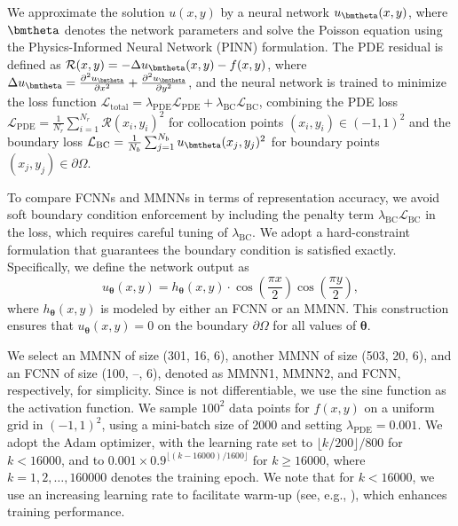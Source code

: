 \documentclass[review,hidelinks,onefignum,onetabnum]{siamart250211}
\begin{document}
 We approximate the solution \( u(x, y) \) by a neural network \( u_\bmtheta(x, y) \), where \( \bmtheta \) denotes the network parameters and solve the Poisson equation using the Physics-Informed Neural Network (PINN) \cite{RAISSI2019686} formulation.
The PDE residual is defined as \(\mathcal{R}(x, y) = -\Delta u_\bmtheta(x, y) - f(x, y)\), where \(\Delta u_\bmtheta = \frac{\partial^2 u_\bmtheta}{\partial x^2} + \frac{\partial^2 u_\bmtheta}{\partial y^2}\), and the neural network is trained to minimize the loss function \(\mathcal{L}_{\text{total}} = \lambda_{\text{PDE}}\mathcal{L}_{\text{PDE}} + \lambda_{\text{BC}}\mathcal{L}_{\text{BC}}\), combining the PDE loss \(\mathcal{L}_{\text{PDE}} = \frac{1}{N_r} \sum_{i=1}^{N_r} \mathcal{R}(x_i, y_i)^2\) for collocation points \((x_i, y_i) \in (-1,1)^2\) and the boundary loss \(\mathcal{L}_{\text{BC}} = \frac{1}{N_b} \sum_{j=1}^{N_b} u_\bmtheta(x_j, y_j)^2\) for boundary points \((x_j, y_j) \in \partial \Omega\).


To compare FCNNs and MMNNs in terms of representation accuracy, we avoid soft boundary condition enforcement by including the penalty term \(\lambda_{\text{BC}}\mathcal{L}_{\text{BC}}\) in the loss, which requires careful tuning of \(\lambda_{\text{BC}}\). 
We adopt a hard-constraint formulation that guarantees the boundary condition is satisfied exactly. Specifically, we define the network output as
\[
u_{\bm{\theta}}(x, y) = h_{\bm{\theta}}(x, y) \cdot \cos\left(\frac{\pi x}{2}\right)\cos\left(\frac{\pi y}{2}\right),
\]
where \( h_{\bm{\theta}}(x, y) \) is modeled by either an FCNN or an MMNN. This construction ensures that \( u_{\bm{\theta}}(x, y) = 0 \) on the boundary \( \partial \Omega \) for all values of \( \bm{\theta} \).


We select an MMNN of size (301, 16, 6), another MMNN of size (503, 20, 6), and an FCNN of size (100, --, 6), denoted as MMNN1, MMNN2, and FCNN, respectively, for simplicity. 
Since \ReLU{} is not differentiable, we use the sine function as the activation function.
We sample \(100^2\) data points for \(f(x,y)\) on a uniform grid in \((-1,1)^2\), using a mini-batch size of 2000 and setting \(\lambda_{\text{PDE}} = 0.001\). 
We adopt the Adam optimizer, with the learning rate set to 
\(\lfloor k/200 \rfloor / 800\) for \(k < 16000\), and to 
\(0.001 \times 0.9^{\lfloor (k - 16000)/1600 \rfloor}\) for 
\(k \geq 16000\), where \(k = 1, 2, \dots, 160000\) denotes the training epoch.
We note that for \( k < 16000 \), we use an increasing learning rate to facilitate warm-up (see, e.g., \cite{NEURIPS2020_288cd256,NEURIPS2024_ca98452d}), which enhances training performance.
\end{document}
